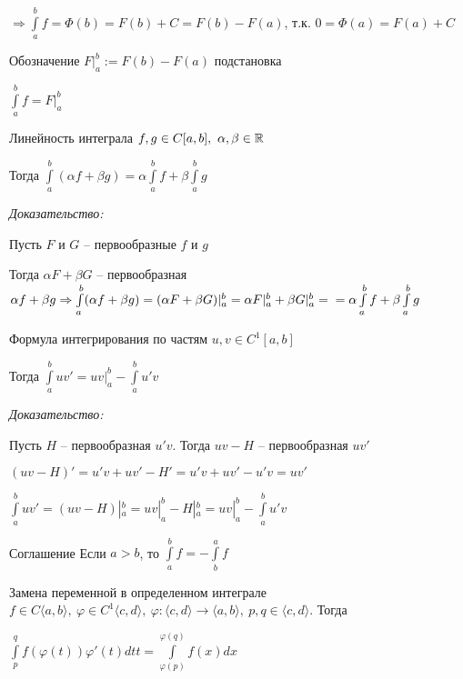 \documentclass[12pt]{article}
\newcommand{\q}[1]{\langle #1 \rangle}
\begin{document}
$\Rightarrow \int\limits_a^b f = \Phi(b) = F(b) + C = F(b) - F(a)$, т.к. $0 = \Phi(a) = F(a) + C$

\begin{nota}{Обозначение}
    $F|_a^b := F(b) - F(a)$ подстановка

    $\int\limits_a^b f = F|_a^b$
\end{nota}

\begin{theo}{Линейность интеграла}
    $f, g \in C[a, b],\ \alpha, \beta \in \mathbb R$

    Тогда $\int\limits_a^b (\alpha f + \beta g) = \alpha \int\limits_a^b f + \beta \int\limits_a^b g$
\end{theo}

\textit{Доказательство:}

Пусть $F$ и $G$ -- первообразные $f$ и $g$

Тогда $\alpha F + \beta G$ -- первообразная $\alpha f + \beta g \Rightarrow \int\limits_a^b (\alpha f + \beta g) = (\alpha F + \beta G)|_a^b = \alpha F|_a^b + \beta G|_a^b = \\
= \alpha \int\limits_a^b f + \beta \int\limits_a^b g$

\begin{theo}{Формула интегрирования по частям}
    $u, v \in C^1[a, b]$

    Тогда $\int\limits_a^b uv' = uv|_a^b - \int\limits_a^b u'v$
\end{theo}

\textit{Доказательство:}

Пусть $H$ -- первообразная $u'v$. Тогда $uv - H$ -- первообразная $uv'$

$(uv - H)' = u'v + uv' - H' = u'v + uv' - u'v = uv'$

$\int\limits_a^b uv' = (uv - H)|_a^b = uv|_a^b - H|_a^b = uv|_a^b - \int\limits_a^b u'v$

\begin{nota}{Соглашение}
    Если $a > b$, то $\int\limits_a^b f = -\int\limits_b^a f$
\end{nota}

\begin{theo}{Замена переменной в определенном интеграле}
    $f \in C\q{a, b},\ \varphi \in C^1\q{c, d},\ \varphi : \q{c, d} \rightarrow \q{a, b},\ p, q \in \q{c, d}$. Тогда

    $\int\limits_p^q f(\varphi(t))\varphi'(t)dtt = \int\limits_{\varphi(p)}^{\varphi(q)} f(x)dx$
\end{theo}
\end{document}
